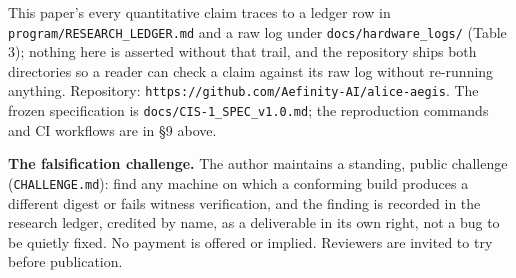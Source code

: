 \documentclass[11pt]{article}
\begin{document}
This paper's every quantitative claim traces to a ledger row in
\texttt{program/RESEARCH\_LEDGER.md} and a raw log under \texttt{docs/hardware\_logs/}
(Table 3); nothing here is asserted without that trail, and the repository
ships both directories so a reader can check a claim against its raw log
without re-running anything. Repository:
\texttt{https://github.com/Aefinity-AI/alice-aegis}. The frozen specification is
\texttt{docs/CIS-1\_SPEC\_v1.0.md}; the reproduction commands and CI workflows are in
§9 above.

\textbf{The falsification challenge.} The author maintains a standing, public
challenge (\texttt{CHALLENGE.md}): find any machine on which a conforming build
produces a different digest or fails witness verification, and the finding
is recorded in the research ledger, credited by name, as a deliverable in
its own right, not a bug to be quietly fixed. No payment is offered or
implied. Reviewers are invited to try before publication.

\nocite{*}


\end{document}
